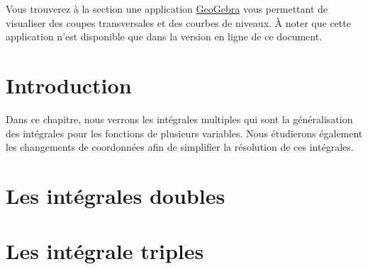\documentclass[]{book}
\theoremstyle{definition}
\theoremstyle{definition}
\theoremstyle{definition}
\theoremstyle{remark}
\begin{document}
Vous trouverez à la section une application
\href{https://www.geogebra.org/?lang=fr}{GeoGebra} vous permettant de
visualiser des coupes transversales et des courbes de niveaux. À noter
que cette application n'est disponible que dans la version en ligne de
ce document.

\hypertarget{introduction-6}{%
\section{Introduction}\label{introduction-6}}

Dans ce chapitre, nous verrons les intégrales multiples qui sont la
généralisation des intégrales pour les fonctions de plusieurs variables.
Nous étudierons également les changements de coordonnées afin de
simplifier la résolution de ces intégrales.

\hypertarget{les-integrales-doubles}{%
\section{Les intégrales doubles}\label{les-integrales-doubles}}

\hypertarget{les-integrale-triples}{%
\section{Les intégrale triples}\label{les-integrale-triples}}


\end{document}

